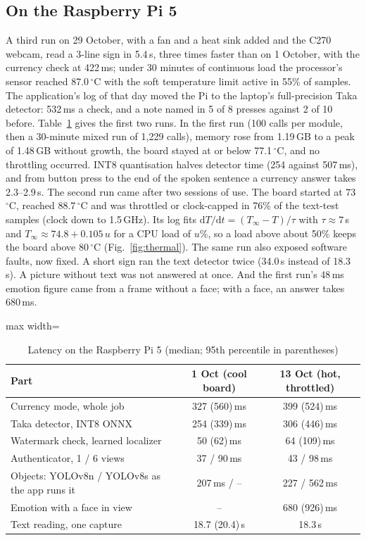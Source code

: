 \documentclass[preprint,12pt]{elsarticle}
\begin{document}
\subsection{On the Raspberry Pi 5}
\label{sec:res_pi}
A third run on 29 October, with a fan and a heat sink added and the C270 webcam, read a 3-line sign in 5.4\,s, three times faster than on 1 October, with the currency check at 422\,ms; under 30 minutes of continuous load the processor's sensor reached 87.0\,$^\circ$C with the soft temperature limit active in 55\% of samples. The application's log of that day moved the Pi to the laptop's full-precision Taka detector: 532\,ms a check, and a note named in 5 of 8 presses against 2 of 10 before. Table~\ref{tab:pi} gives the first two runs. In the first run (100 calls per module, then a 30-minute mixed run of 1,229 calls), memory rose from 1.19\,GB to a peak of 1.48\,GB without growth, the board stayed at or below 77.1\,$^\circ$C, and no throttling occurred. INT8 quantisation halves detector time (254 against 507\,ms), and from button press to the end of the spoken sentence a currency answer takes 2.3--2.9\,s. The second run came after two sessions of use. The board started at 73\,$^\circ$C, reached 88.7\,$^\circ$C and was throttled or clock-capped in 76\% of the text-test samples (clock down to 1.5\,GHz). Its log fits $\mathrm dT/\mathrm dt=(T_\infty-T)/\tau$ with $\tau\approx7$\,s and $T_\infty\approx74.8+0.105\,u$ for a CPU load of $u\%$, so a load above about 50\% keeps the board above 80\,$^\circ$C (Fig.~\ref{fig:thermal}). The same run also exposed software faults, now fixed. A short sign ran the text detector twice (34.0\,s instead of 18.3\,s). A picture without text was not answered at once. And the first run's 48\,ms emotion figure came from a frame without a face; with a face, an answer takes 680\,ms.

\begin{table}[!htbp]
\caption{Latency on the Raspberry Pi 5 (median; 95th percentile in parentheses)}
\label{tab:pi}
\centering\small
\begin{adjustbox}{max width=\textwidth}\begin{tabular}{@{}lcc@{}}
\toprule
Part & 1 Oct (cool board) & 13 Oct (hot, throttled) \\ \midrule
Currency mode, whole job & 327 (560)\,ms & 399 (524)\,ms \\
Taka detector, INT8 ONNX & 254 (339)\,ms & 306 (446)\,ms \\
Watermark check, learned localizer & 50 (62)\,ms & 64 (109)\,ms \\
Authenticator, 1 / 6 views & 37 / 90\,ms & 43 / 98\,ms \\
Objects: YOLOv8n / YOLOv8s as the app runs it & 207\,ms / -- & 227 / 562\,ms \\
Emotion with a face in view & -- & 680 (926)\,ms \\
Text reading, one capture & 18.7 (20.4)\,s & 18.3\,s \\ \bottomrule
\end{tabular}\end{adjustbox}
\end{table}
\end{document}
